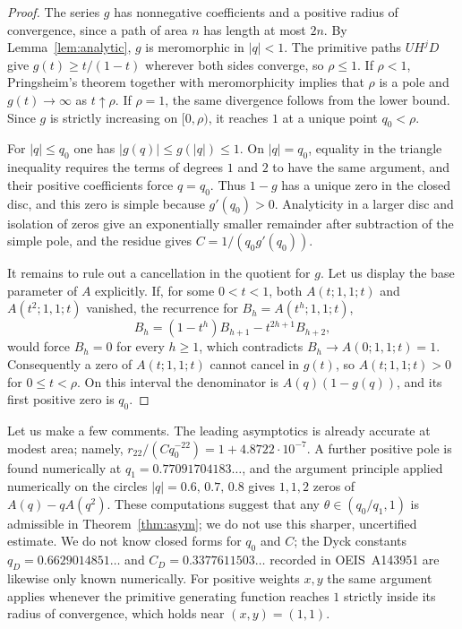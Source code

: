 \documentclass[11pt,reqno]{amsart}
\numberwithin{equation}{section}
\theoremstyle{remark}
\begin{document}
\begin{proof}
The series $g$ has nonnegative coefficients and a positive radius of convergence, since
a path of area $n$ has length at most $2n$. By Lemma~\ref{lem:analytic}, $g$ is
meromorphic in $|q|<1$. The primitive
paths $UH^jD$ give $g(t)\ge t/(1-t)$ wherever both sides converge, so $\rho\le1$. If
$\rho<1$, Pringsheim's theorem together with meromorphicity implies that $\rho$ is a pole
and $g(t)\to\infty$ as $t\uparrow\rho$. If $\rho=1$, the same divergence follows from the
lower bound. Since $g$ is strictly increasing on $[0,\rho)$, it reaches $1$ at a unique
point $q_0<\rho$.

For $|q|\le q_0$ one has $|g(q)|\le g(|q|)\le1$. On $|q|=q_0$, equality in the triangle
inequality requires the terms of degrees $1$ and $2$ to have the same argument, and their
positive coefficients force $q=q_0$. Thus $1-g$ has a unique zero in the closed disc, and
this zero is simple because $g'(q_0)>0$. Analyticity in a larger disc and isolation of
zeros give an exponentially smaller remainder after subtraction of the simple pole, and
the residue gives $C=1/(q_0g'(q_0))$.

It remains to rule out a cancellation in the quotient for $g$. Let us display the base
parameter of $A$ explicitly. If, for some $0<t<1$, both $A(t;1,1;t)$ and $A(t^2;1,1;t)$
vanished, the recurrence for $B_h=A(t^h;1,1;t)$,
\[
B_h=(1-t^h)B_{h+1}-t^{2h+1}B_{h+2},
\]
would force $B_h=0$ for every $h\ge1$, which contradicts $B_h\to A(0;1,1;t)=1$.
Consequently a zero of $A(t;1,1;t)$ cannot cancel in $g(t)$, so $A(t;1,1;t)>0$ for
$0\le t<\rho$. On this interval the denominator is $A(q)(1-g(q))$, and its first positive
zero is $q_0$.
\end{proof}

Let us make a few comments. The leading asymptotics is already accurate at modest area;
namely, $r_{22}/(Cq_0^{-22})=1+4.8722\cdot10^{-7}$. A further positive pole is found
numerically at $q_1=0.77091704183\ldots$, and the argument principle applied numerically
on the circles $|q|=0.6,\,0.7,\,0.8$ gives $1,1,2$ zeros of $A(q)-qA(q^2)$. These
computations suggest that any $\theta\in(q_0/q_1,1)$ is admissible in
Theorem~\ref{thm:asym}; we do not use this sharper, uncertified estimate. We do not know closed forms for
$q_0$ and $C$; the Dyck constants $q_D=0.6629014851\ldots$ and $C_D=0.3377611503\ldots$
recorded in OEIS~A143951 \cite{OEIS} are likewise only known numerically. For positive
weights $x,y$ the same argument applies whenever the primitive generating function reaches
$1$ strictly inside its radius of convergence, which holds near $(x,y)=(1,1)$.
\end{document}
